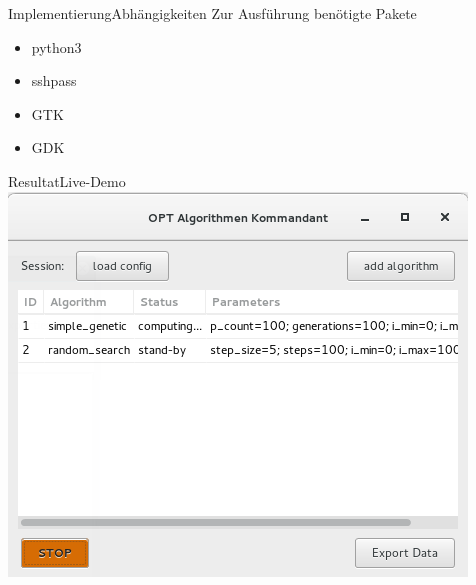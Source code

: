 \documentclass[ngerman,10pt,xcolor=colortbl,compress
]{beamer}
\begin{document}
	\begin{frame}{Implementierung}{Abhängigkeiten}
		Zur Ausführung benötigte Pakete
		\begin{itemize}
			\item python3
			\item sshpass
			\item GTK
			\item GDK
		\end{itemize}
	\end{frame}
	
	\begin{frame}{Resultat}{Live-Demo}
	\includegraphics[scale=0.4]{gui.png}
	\end{frame}

	
\end{document}
